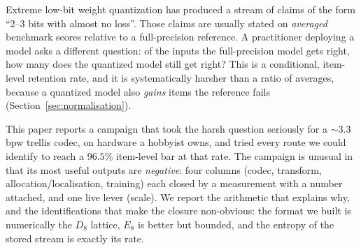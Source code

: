 \documentclass[11pt,a4paper]{article}
\begin{document}
Extreme low-bit weight quantization has produced a stream of claims of the form ``2--3 bits with
almost no loss''. Those claims are usually stated on \emph{averaged} benchmark scores relative to
a full-precision reference. A practitioner deploying a model asks a different question: of the
inputs the full-precision model gets right, how many does the quantized model still get right?
This is a conditional, item-level retention rate, and it is systematically harsher than a ratio of
averages, because a quantized model also \emph{gains} items the reference fails (Section~\ref{sec:normalisation}).

This paper reports a campaign that took the harsh question seriously for a $\sim$3.3\,bpw
trellis codec, on hardware a hobbyist owns, and tried every route we could identify to reach a
$96.5\%$ item-level bar at that rate. The campaign is unusual in that its most useful outputs are
\emph{negative}: four columns (codec, transform, allocation/localisation, training) each closed by
a measurement with a number attached, and one live lever (scale). We report the arithmetic that
explains why, and the identifications that make the closure non-obvious: the format we built is
numerically the $D_8$ lattice, $E_8$ is better but bounded, and the entropy of the stored stream
is exactly its rate.
\end{document}

